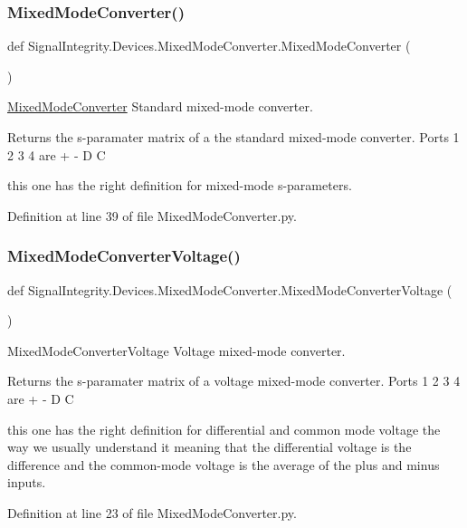 \subsubsection{\texorpdfstring{Mixed\+Mode\+Converter()}{MixedModeConverter()}}
{\footnotesize\ttfamily def Signal\+Integrity.\+Devices.\+Mixed\+Mode\+Converter.\+Mixed\+Mode\+Converter (\begin{DoxyParamCaption}{ }\end{DoxyParamCaption})}



\hyperlink{namespaceSignalIntegrity_1_1Devices_1_1MixedModeConverter}{Mixed\+Mode\+Converter} Standard mixed-\/mode converter. 

\begin{DoxyReturn}{Returns}
the s-\/paramater matrix of a the standard mixed-\/mode converter. Ports 1 2 3 4 are + -\/ D C
\end{DoxyReturn}
this one has the right definition for mixed-\/mode s-\/parameters. 

Definition at line 39 of file Mixed\+Mode\+Converter.\+py.

\mbox{\label{namespaceSignalIntegrity_1_1Devices_1_1MixedModeConverter_a373cd4a14b6f9ea44be46f2ded959e64}} 
\subsubsection{\texorpdfstring{Mixed\+Mode\+Converter\+Voltage()}{MixedModeConverterVoltage()}}
{\footnotesize\ttfamily def Signal\+Integrity.\+Devices.\+Mixed\+Mode\+Converter.\+Mixed\+Mode\+Converter\+Voltage (\begin{DoxyParamCaption}{ }\end{DoxyParamCaption})}



Mixed\+Mode\+Converter\+Voltage Voltage mixed-\/mode converter. 

\begin{DoxyReturn}{Returns}
the s-\/paramater matrix of a voltage mixed-\/mode converter. Ports 1 2 3 4 are + -\/ D C
\end{DoxyReturn}
this one has the right definition for differential and common mode voltage the way we usually understand it meaning that the differential voltage is the difference and the common-\/mode voltage is the average of the plus and minus inputs. 

Definition at line 23 of file Mixed\+Mode\+Converter.\+py.

